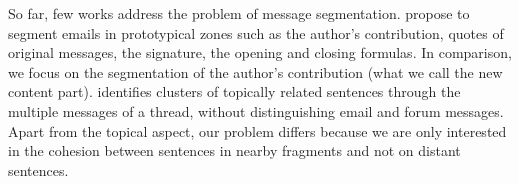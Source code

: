 So far, few works address the problem of message segmentation.
\cite{lampert:2009:emnlp} propose to segment emails in prototypical zones such as the author's contribution, quotes of original messages, the signature, the opening and closing formulas. 
In comparison, we focus on the segmentation of the author's contribution (what we call the new content part).
\cite{joty:2013:jair} identifies %
clusters of topically related sentences through the multiple messages of a thread, without distinguishing email and forum messages. Apart from the topical aspect, our problem differs because we are only interested in the cohesion between sentences in nearby fragments and %
 not on distant sentences.

